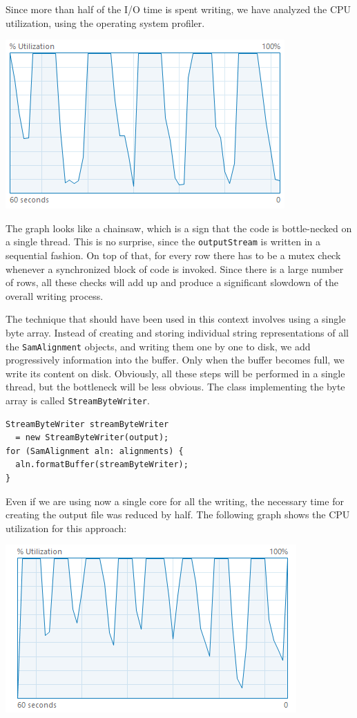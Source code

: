 \documentclass[a4paper,twoside]{article}
\begin{document}
Since more than half of the I/O time is spent writing, we have analyzed the CPU utilization, using the operating system profiler.
\begin{center}
\includegraphics[scale=0.5]{images/cpu_original.png}
\end{center}
The graph looks like a chainsaw, which is a sign that the code is bottle-necked on a single thread. This is no surprise, since the {\tt outputStream} is written in a sequential fashion.
On top of that, for every row there has to be a mutex check whenever a synchronized block of code is invoked. Since there is a large number of rows, all these checks will add up and produce a significant slowdown of the overall writing process.

The technique that should have been used in this context involves using a single byte array.
Instead of creating and storing individual string representations of all the {\tt SamAlignment} objects, and writing them one by one to disk, we add progressively information into the buffer. Only when the buffer becomes full, we write its content on disk. Obviously, all these steps will be performed in a single thread, but the bottleneck will be less obvious. The class implementing the byte array is called {\tt StreamByteWriter}.
\begin{verbatim}
StreamByteWriter streamByteWriter 
  = new StreamByteWriter(output);
for (SamAlignment aln: alignments) {
  aln.formatBuffer(streamByteWriter);
}
\end{verbatim}
Even if we are using now a single core for all the writing, the necessary time for creating the output file was reduced by half. The following graph shows the CPU utilization for this approach:
\begin{center}
\includegraphics[scale=0.5]{images/cpu_optimized.png}
\end{center}
\end{document}
